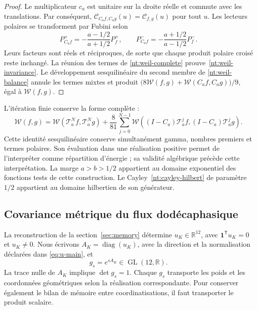 \begin{proof}
Le multiplicateur \(c_a\) est unitaire sur la droite réelle et
commute avec les translations. Par conséquent,
\(\mathcal C_{C_af,C_ag}(u)=\mathcal C_{f,g}(u)\)
pour tout \(u\). Les lecteurs polaires se transforment
par Fubini selon
\[
 P_{C_af}^+
 =-\frac{a-1/2}{a+1/2}P_f^+,\qquad
 P_{C_af}^-
 =-\frac{a+1/2}{a-1/2}P_f^-.
\]
Leurs facteurs sont réels et réciproques, de sorte que chaque produit polaire croisé reste inchangé. La réunion des termes de \eqref{nt:weil-complete} prouve~\eqref{nt:weil-invariance}. Le développement sesquilinéaire du second membre de \eqref{nt:weil-balance} annule les termes mixtes et produit \(\bigl(8\mathscr W(f,g)+
\mathscr W(C_af,C_ag)\bigr)/9\), égal à \(\mathscr W(f,g)\).
\end{proof}

L’itération finie conserve la forme complète :
\[
 \mathscr W(f,g)
 =\mathscr W(\mathcal T_a^Nf,\mathcal T_a^Ng)
 +\frac8{81}\sum_{j=0}^{N-1}
 \mathscr W((I-C_a)\mathcal T_a^jf,
            (I-C_a)\mathcal T_a^jg).
\]
Cette identité sesquilinéaire conserve simultanément
gamma, nombres premiers et termes polaires. Son évaluation dans une
réalisation positive permet de l’interpréter comme répartition
d’énergie ; sa validité algébrique précède cette
interprétation. La marge \(a>b>1/2\) appartient au
domaine exponentiel des fonctions tests de cette construction.
Le Cayley~\eqref{nt:cayley-hilbert} de paramètre \(1/2\)
appartient au domaine hilbertien de son générateur.

\subsection{Covariance métrique du flux dodécaphasique}

La reconstruction de la section~\ref{sec:memory} détermine \(u_K\in\mathbb R^{12}\), avec \(\mathbf1^{\mathsf T}u_K=0\) et \(u_K\ne0\). Nous écrivons \(A_K=\operatorname{diag}(u_K)\), avec la direction et la normalisation déclarées dans \eqref{eq:u-main}, et
\[
 g_s=e^{sA_K}\in\operatorname{GL}(12,\mathbb R).
\]
La trace nulle de \(A_K\) implique \(\det g_s=1\). Chaque \(g_s\) transporte les poids et les coordonnées géométriques selon la réalisation correspondante. Pour conserver également le bilan de mémoire entre coordinatisations, il faut transporter le produit scalaire.


